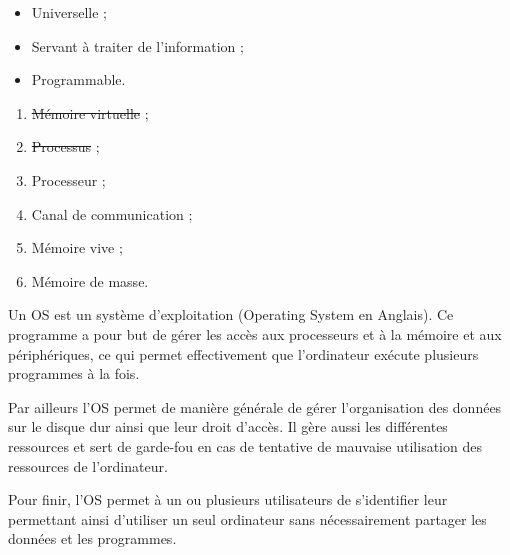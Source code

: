 \question{}

\begin{itemize}
\item Universelle ; 
\item Servant à traiter de l'information ;
\item Programmable.
\end{itemize}

\question{}

\begin{enumerate}[label=(\alph*)]
\item \sout{Mémoire virtuelle} ;
\item \sout{Processus} ;
\item Processeur ;
\item Canal de communication ;
\item Mémoire vive ;
\item Mémoire de masse.
\end{enumerate}


\question{}

Un OS est un système d'exploitation (Operating System en Anglais). 
Ce programme a pour but de gérer les accès aux processeurs et à la mémoire et aux périphériques, ce qui permet effectivement que l'ordinateur exécute plusieurs programmes à la fois.

Par ailleurs l'OS permet de manière générale de gérer l'organisation des données sur le disque dur ainsi que leur droit d'accès. Il gère aussi les différentes ressources et sert de garde-fou en cas de tentative de mauvaise utilisation des ressources de l'ordinateur.

Pour finir, l'OS permet à un ou plusieurs utilisateurs de s'identifier leur permettant ainsi d'utiliser un seul ordinateur sans nécessairement partager les données et les programmes. 